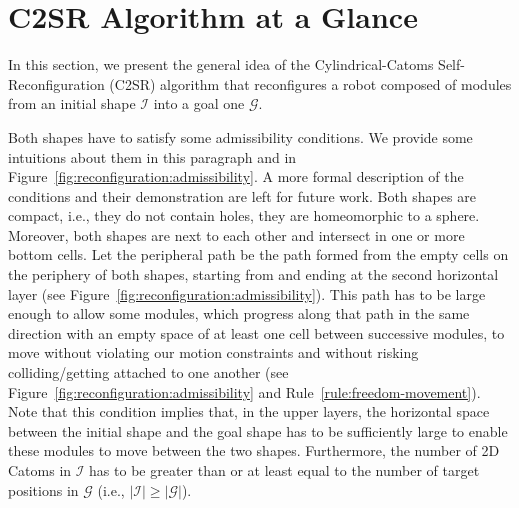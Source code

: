 \section{C2SR Algorithm at a Glance}
\label{section:reconfiguration:at-a-glance}

In this section, we present the general idea of the Cylindrical-Catoms Self-Reconfiguration (C2SR) algorithm that reconfigures a robot composed of modules from an initial shape $\mathcal{I}$ into a goal one $\mathcal{G}$. 

Both shapes have to satisfy some admissibility conditions. We provide some intuitions about them in this paragraph and in Figure~\ref{fig:reconfiguration:admissibility}. A more formal description of the conditions and their demonstration are left for future work. Both shapes are compact, i.e., they do not contain holes, they are homeomorphic to a sphere. Moreover, both shapes are next to each other and intersect in one or more bottom cells. Let the peripheral path be the path formed from the empty cells on the periphery of both shapes, starting from and ending at the second horizontal layer (see Figure~\ref{fig:reconfiguration:admissibility}). This path has to be large enough to allow some modules, which progress along that path in the same direction with an empty space of at least one cell between successive modules, to move without violating our motion constraints and without risking colliding/getting attached to one another (see Figure~\ref{fig:reconfiguration:admissibility} and Rule~\ref{rule:freedom-movement}). Note that this condition implies that, in the upper layers, the horizontal space between the initial shape and the goal shape has to be sufficiently large to enable these modules to move between the two shapes. Furthermore, the number of 2D Catoms in $\mathcal{I}$ has to be greater than or at least equal to the number of target positions in $\mathcal{G}$ (i.e., $|\mathcal{I}| \geq |\mathcal{G}|$).

